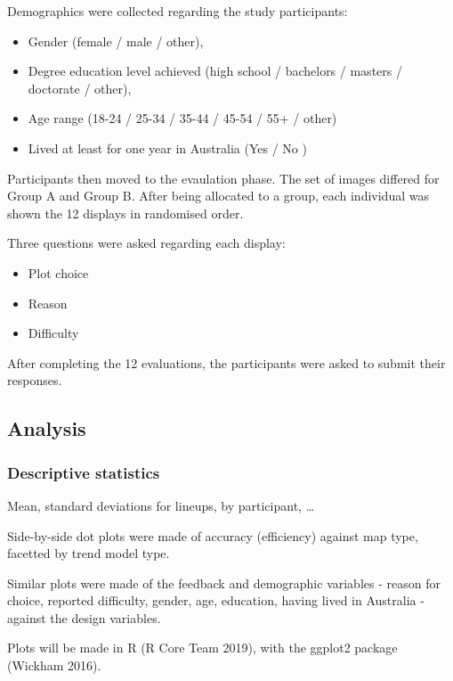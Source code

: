 \documentclass[conference,final,]{IEEEtran}
\providecommand{\tightlist}{%
  \setlength{\itemsep}{0pt}\setlength{\parskip}{0pt}}
\begin{document}
Demographics were collected regarding the study participants:

\begin{itemize}
\tightlist
\item
  Gender (female / male / other),
\item
  Degree education level achieved (high school / bachelors / masters / doctorate / other),
\item
  Age range (18-24 / 25-34 / 35-44 / 45-54 / 55+ / other)
\item
  Lived at least for one year in Australia (Yes / No )
\end{itemize}

Participants then moved to the evaulation phase.
The set of images differed for Group A and Group B.
After being allocated to a group, each individual was shown the 12 displays in randomised order.

Three questions were asked regarding each display:

\begin{itemize}
\tightlist
\item
  Plot choice
\item
  Reason
\item
  Difficulty
\end{itemize}

After completing the 12 evaluations, the participants were asked to submit their responses.

\hypertarget{analysis}{%
\subsection{Analysis}\label{analysis}}

\hypertarget{descriptive-statistics}{%
\subsubsection{Descriptive statistics}\label{descriptive-statistics}}

Mean, standard deviations for lineups, by participant, \ldots{}

Side-by-side dot plots were made of accuracy (efficiency) against map type, facetted by trend model type.

Similar plots were made of the feedback and demographic variables - reason for choice, reported difficulty, gender, age, education, having lived in Australia - against the design variables.

Plots will be made in R (R Core Team 2019), with the ggplot2 package (Wickham 2016).
\end{document}
